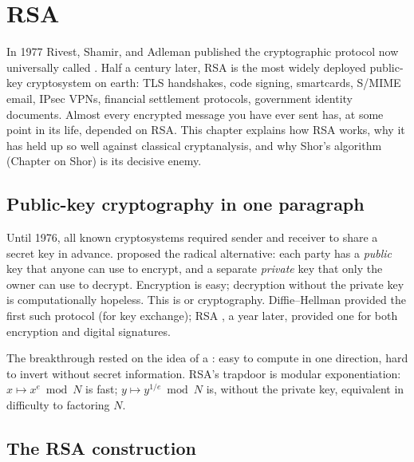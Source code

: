 \chapter{RSA}


In 1977 Rivest, Shamir, and Adleman published the cryptographic protocol now universally called  \citep{rivest_method_1978}. Half a century later, RSA is the most widely deployed public-key cryptosystem on earth: TLS handshakes, code signing, smartcards, S/MIME email, IPsec VPNs, financial settlement protocols, government identity documents. Almost every encrypted message you have ever sent has, at some point in its life, depended on RSA. This chapter explains how RSA works, why it has held up so well against classical cryptanalysis, and why Shor's algorithm (Chapter on Shor) is its decisive enemy.

\section{Public-key cryptography in one paragraph}

Until 1976, all known cryptosystems required sender and receiver to share a secret key in advance. \citet{diffie_new_1976} proposed the radical alternative: each party has a \emph{public} key that anyone can use to encrypt, and a separate \emph{private} key that only the owner can use to decrypt. Encryption is easy; decryption without the private key is computationally hopeless. This is  or  cryptography. Diffie--Hellman provided the first such protocol (for key exchange); RSA \citep{rivest_method_1978}, a year later, provided one for both encryption and digital signatures.

The breakthrough rested on the idea of a : easy to compute in one direction, hard to invert without secret information. RSA's trapdoor is modular exponentiation: $x \mapsto x^e \bmod N$ is fast; $y \mapsto y^{1/e} \bmod N$ is, without the private key, equivalent in difficulty to factoring $N$.

\section{The RSA construction}

